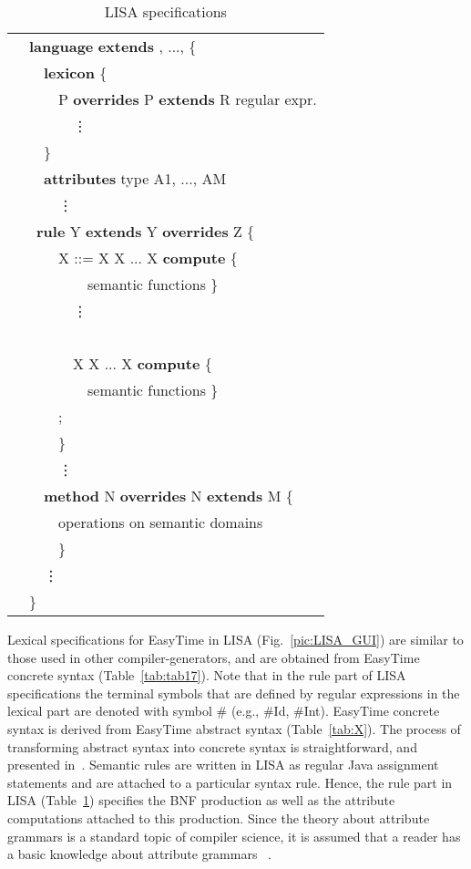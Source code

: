 \documentclass[preprint, prX]{revtex4}
\begin{document}
\begin{table}[htb]           \caption{LISA specifications}
\label{tab:tab30}
\vspace{-5mm}
\footnotesize
\begin{center}
\begin{tabular}{ | l | }
\hline
\ \ {\bf language }   {\bf extends} , ...,  \{\\
\ \ \ \ {\bf lexicon} \{\\
\ \ \ \ \ \ P {\bf overrides}  P {\bf extends} R regular expr.\\
\ \ \ \ \ \ \ \ \vdots\\
\ \ \ \ \}\\
\ \ \ \ {\bf attributes} type A1, ..., AM\\
\ \ \ \ \ \ \vdots\\
\ \ \ {\bf rule} Y {\bf extends}  Y {\bf overrides} Z \{\\
\ \ \ \ \ \ X ::= X X ... X {\bf compute} \{\\
\ \ \ \ \ \ \ \ \ \ semantic functions \}\\
\ \ \ \ \ \ \ \ \vdots\\
\ \ \ \ \ \ \\
\ \ \ \ \ \ \ \ X X ... X {\bf compute} \{\\
\ \ \ \ \ \ \ \ \ \ semantic functions \} \\
\ \ \ \ \ \ ;\\
\ \ \ \ \ \ \}\\
\ \ \ \ \ \ \vdots\\
\ \ \ \ {\bf method} N {\bf overrides}  N {\bf extends} M \{\\
\ \ \ \ \ \ operations on semantic domains\\
\ \ \ \ \ \ \}\\
\ \ \ \ \vdots\\
\ \ \} \\
\hline
\end{tabular}
\end{center}
\normalsize
\vspace{-5mm}
\end{table}

Lexical specifications for EasyTime in LISA (Fig.~\ref{pic:LISA_GUI}) are similar to those used in other compiler-generators,
and are obtained from EasyTime concrete syntax (Table~\ref{tab:tab17}). Note that in the rule part of LISA specifications the terminal symbols that are defined by regular expressions in the lexical part are denoted with symbol \# (e.g., \#Id, \#Int).
EasyTime concrete syntax is derived from EasyTime abstract syntax (Table~\ref{tab:X}). The process of transforming abstract syntax into concrete syntax is straightforward, and presented in~\cite{Fister:2011}.
Semantic rules are written in LISA as regular Java assignment statements and are attached to a particular syntax rule. Hence, the rule part in LISA (Table~\ref{tab:tab30}) specifies the BNF production as well as the attribute computations attached to this production.
Since the theory about attribute grammars is a standard topic of compiler science, it is assumed that a reader has a basic knowledge about attribute grammars ~\cite{Knuth:1968,Paakki:1995}.
\end{document}
